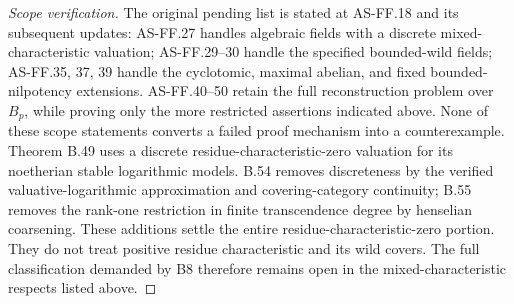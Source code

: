 \documentclass[11pt,a4paper]{article}
\begin{document}
\begin{proof}[Scope verification]
The original pending list is stated at AS-FF.18 and its subsequent
updates: AS-FF.27 handles algebraic fields with a discrete
mixed-characteristic valuation; AS-FF.29--30 handle the specified
bounded-wild fields; AS-FF.35, 37, 39 handle the cyclotomic, maximal
abelian, and fixed bounded-nilpotency extensions. AS-FF.40--50 retain
the full reconstruction problem over \(B_p\), while proving only the
more restricted assertions indicated above. None of these scope
statements converts a failed proof mechanism into a counterexample.
Theorem B.49 uses a discrete residue-characteristic-zero valuation
for its noetherian stable logarithmic models. B.54 removes
discreteness by the verified valuative-logarithmic approximation
and covering-category continuity; B.55 removes the rank-one
restriction in finite transcendence degree by henselian coarsening.
These additions settle the entire residue-characteristic-zero
portion. They do not treat positive residue characteristic and
its wild covers. The full classification demanded by B8 therefore
remains open in the mixed-characteristic respects listed above.
\end{proof}
\end{document}
